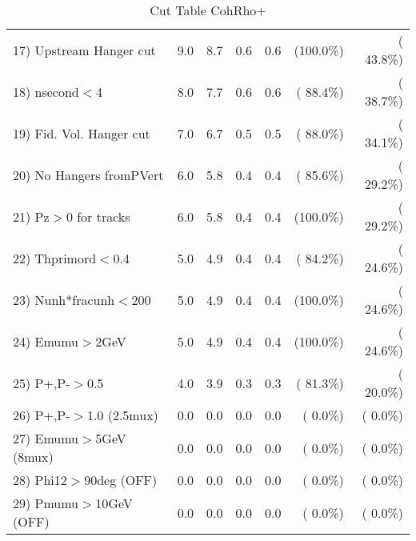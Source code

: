 \begin{table}[h!]
\begin{tabular}{||l||r|r|r|r|r|r||}
 17) Upstream Hanger cut  &          9.0 &          8.7 &          0.6 &          0.6 & (100.0\%) & ( 43.8\%) \\
 18) nsecond$<$4          &          8.0 &          7.7 &          0.6 &          0.6 & ( 88.4\%) & ( 38.7\%) \\
 19) Fid. Vol. Hanger cut &          7.0 &          6.7 &          0.5 &          0.5 & ( 88.0\%) & ( 34.1\%) \\
 20) No Hangers fromPVert &          6.0 &          5.8 &          0.4 &          0.4 & ( 85.6\%) & ( 29.2\%) \\
 21) Pz$>$0 for tracks    &          6.0 &          5.8 &          0.4 &          0.4 & (100.0\%) & ( 29.2\%) \\
 22) Thprimord$<$0.4      &          5.0 &          4.9 &          0.4 &          0.4 & ( 84.2\%) & ( 24.6\%) \\
 23) Nunh*fracunh$<$200   &          5.0 &          4.9 &          0.4 &          0.4 & (100.0\%) & ( 24.6\%) \\
 24) Emumu$>$2GeV         &          5.0 &          4.9 &          0.4 &          0.4 & (100.0\%) & ( 24.6\%) \\
 25) P+,P-$>$0.5          &          4.0 &          3.9 &          0.3 &          0.3 & ( 81.3\%) & ( 20.0\%) \\
 26) P+,P-$>$1.0 (2.5mux) &          0.0 &          0.0 &          0.0 &          0.0 & (  0.0\%) & (  0.0\%) \\
 27) Emumu$>$5GeV  (8mux) &          0.0 &          0.0 &          0.0 &          0.0 & (  0.0\%) & (  0.0\%) \\
 28) Phi12$>$90deg  (OFF) &          0.0 &          0.0 &          0.0 &          0.0 & (  0.0\%) & (  0.0\%) \\
 29) Pmumu$>$10GeV  (OFF) &          0.0 &          0.0 &          0.0 &          0.0 & (  0.0\%) & (  0.0\%) \\
 \hline
 \hline
 \end{tabular}
 \caption{Cut Table  CohRho+  }
 \label{tab-cutcohjpsi-mumu_anumunc}
 \end{table}
